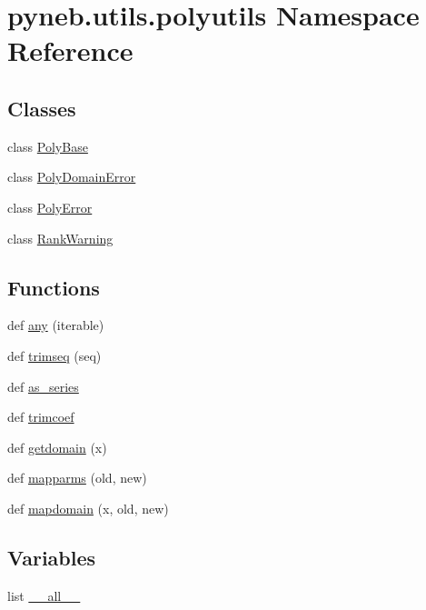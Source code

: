 \hypertarget{namespacepyneb_1_1utils_1_1polyutils}{}\section{pyneb.\+utils.\+polyutils Namespace Reference}
\label{namespacepyneb_1_1utils_1_1polyutils}
\subsection*{Classes}
\begin{DoxyCompactItemize}
\item 
class \hyperlink{classpyneb_1_1utils_1_1polyutils_1_1_poly_base}{Poly\+Base}
\item 
class \hyperlink{classpyneb_1_1utils_1_1polyutils_1_1_poly_domain_error}{Poly\+Domain\+Error}
\item 
class \hyperlink{classpyneb_1_1utils_1_1polyutils_1_1_poly_error}{Poly\+Error}
\item 
class \hyperlink{classpyneb_1_1utils_1_1polyutils_1_1_rank_warning}{Rank\+Warning}
\end{DoxyCompactItemize}
\subsection*{Functions}
\begin{DoxyCompactItemize}
\item 
def \hyperlink{namespacepyneb_1_1utils_1_1polyutils_a7a16ae5631115dce0a513eaec3a06470}{any} (iterable)
\item 
def \hyperlink{namespacepyneb_1_1utils_1_1polyutils_a2d09c123dbbcfd4623784cacf1fc945c}{trimseq} (seq)
\item 
def \hyperlink{namespacepyneb_1_1utils_1_1polyutils_a9c3751d438f0f75922155c7823fe2699}{as\+\_\+series}
\item 
def \hyperlink{namespacepyneb_1_1utils_1_1polyutils_a505e3038cfd08b7f444ecca2234daa46}{trimcoef}
\item 
def \hyperlink{namespacepyneb_1_1utils_1_1polyutils_a3216f3b76273619e84e2e0e6c22dbf21}{getdomain} (x)
\item 
def \hyperlink{namespacepyneb_1_1utils_1_1polyutils_a3621b172891db0806163f72f22e3723b}{mapparms} (old, new)
\item 
def \hyperlink{namespacepyneb_1_1utils_1_1polyutils_a9a4c51bf58904c4c9ddc7d7525404481}{mapdomain} (x, old, new)
\end{DoxyCompactItemize}
\subsection*{Variables}
\begin{DoxyCompactItemize}
\item 
list \hyperlink{namespacepyneb_1_1utils_1_1polyutils_aa4a022e6ddacd362b83964da5cc5d044}{\+\_\+\+\_\+all\+\_\+\+\_\+}
\end{DoxyCompactItemize}


